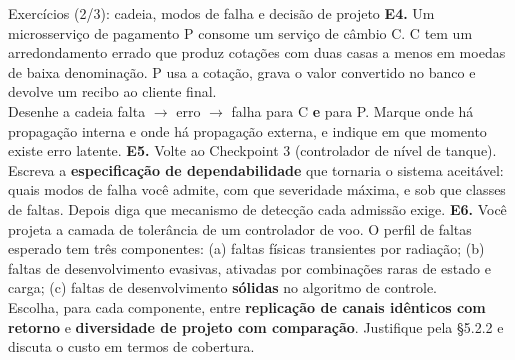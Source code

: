 \documentclass{beamer}
\begin{document}
\begin{frame}{Exerc\'icios (2/3): cadeia, modos de falha e decis\~ao de projeto}
    \footnotesize
    \textbf{E4.} Um microsservi\c{c}o de pagamento P consome um servi\c{c}o de c\^ambio C. C tem um arredondamento errado que produz cota\c{c}\~oes com duas casas a menos em moedas de baixa denomina\c{c}\~ao. P usa a cota\c{c}\~ao, grava o valor convertido no banco e devolve um recibo ao cliente final.\\
    Desenhe a cadeia falta $\rightarrow$ erro $\rightarrow$ falha para C \textbf{e} para P. Marque onde h\'a propaga\c{c}\~ao interna e onde h\'a propaga\c{c}\~ao externa, e indique em que momento existe erro latente.
    \medskip
    \textbf{E5.} Volte ao Checkpoint 3 (controlador de n\'ivel de tanque). Escreva a \textbf{especifica\c{c}\~ao de dependabilidade} que tornaria o sistema aceit\'avel: quais modos de falha voc\^e admite, com que severidade m\'axima, e sob que classes de faltas. Depois diga que mecanismo de detec\c{c}\~ao cada admiss\~ao exige.
    \medskip
    \textbf{E6.} Voc\^e projeta a camada de toler\^ancia de um controlador de voo. O perfil de faltas esperado tem tr\^es componentes: (a) faltas f\'isicas transientes por radia\c{c}\~ao; (b) faltas de desenvolvimento evasivas, ativadas por combina\c{c}\~oes raras de estado e carga; (c) faltas de desenvolvimento \textbf{s\'olidas} no algoritmo de controle.\\
    Escolha, para cada componente, entre \textbf{replica\c{c}\~ao de canais id\^enticos com retorno} e \textbf{diversidade de projeto com compara\c{c}\~ao}. Justifique pela \S5.2.2 e discuta o custo em termos de cobertura.
\end{frame}
\end{document}
